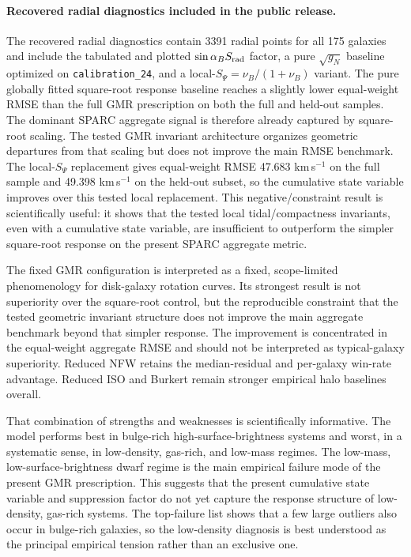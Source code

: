 ﻿\documentclass[twocolumn,linenumbers]{aastex701}
\begin{document}
\paragraph{Recovered radial diagnostics included in the public release.} The recovered radial diagnostics contain 3391 radial points for all 175 galaxies and include the tabulated and plotted $\sin\alpha_B S_{\rm rad}$ factor, a pure $\sqrt{g_N}$ baseline optimized on \texttt{calibration\_24}, and a local-$S_\Psi=\nu_B/(1+\nu_B)$ variant. The pure globally fitted square-root response baseline reaches a slightly lower equal-weight RMSE than the full GMR prescription on both the full and held-out samples. The dominant SPARC aggregate signal is therefore already captured by square-root scaling. The tested GMR invariant architecture organizes geometric departures from that scaling but does not improve the main RMSE benchmark. The local-$S_\Psi$ replacement gives equal-weight RMSE 47.683 km\,s$^{-1}$ on the full sample and 49.398 km\,s$^{-1}$ on the held-out subset, so the cumulative state variable improves over this tested local replacement. This negative/constraint result is scientifically useful: it shows that the tested local tidal/compactness invariants, even with a cumulative state variable, are insufficient to outperform the simpler square-root response on the present SPARC aggregate metric.


The fixed GMR configuration is interpreted as a fixed, scope-limited phenomenology for disk-galaxy rotation curves. Its strongest result is not superiority over the square-root control, but the reproducible constraint that the tested geometric invariant structure does not improve the main aggregate benchmark beyond that simpler response. The improvement is concentrated in the equal-weight aggregate RMSE and should not be interpreted as typical-galaxy superiority. Reduced NFW retains the median-residual and per-galaxy win-rate advantage. Reduced ISO and Burkert remain stronger empirical halo baselines overall.

That combination of strengths and weaknesses is scientifically informative. The model performs best in bulge-rich high-surface-brightness systems and worst, in a systematic sense, in low-density, gas-rich, and low-mass regimes. The low-mass, low-surface-brightness dwarf regime is the main empirical failure mode of the present GMR prescription. This suggests that the present cumulative state variable and suppression factor do not yet capture the response structure of low-density, gas-rich systems. The top-failure list shows that a few large outliers also occur in bulge-rich galaxies, so the low-density diagnosis is best understood as the principal empirical tension rather than an exclusive one.
\end{document}
